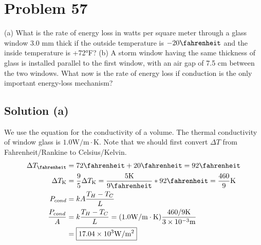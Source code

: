 \documentclass[12pt]{article}
\begin{document}
    \pagebreak
    \section{Problem 57}
        (a) What is the rate of energy loss in watts per square meter through a glass window 3.0 mm thick if the outside temperature is $-20\unit{\fahrenheit}$ and the inside temperature is +72°F? 
        (b) A storm window having the same thickness of glass is installed parallel to the first window, with an air gap of 7.5 cm between the two windows. 
        What now is the rate of energy loss if conduction is the only important energy-loss mechanism?

        \subsection{Solution (a)}
            We use the equation for the conductivity of a volume.
            The thermal conductivity of window glass is $1.0 \unit{\watt/\meter\cdot\kelvin}$. 
            Note that we should first convert $\Delta T$ from Fahrenheit/Rankine to Celsius/Kelvin.
            \begin{align}
                \Delta T_{\unit{\fahrenheit}}   &=  72 \unit{\fahrenheit} + 20 \unit{\fahrenheit}
                    =   92 \unit{\fahrenheit}\\
                \Delta T_{\unit{\kelvin}}  &=  \frac{9}{5} \Delta T_{\unit{\kelvin}}
                    =   \frac{5 \unit{\kelvin}}{9 \unit{\fahrenheit}} * 92 \unit{\fahrenheit}
                    =   \frac{460}{9} \unit{\kelvin}\\
                P_{cond}    &=  kA\frac{T_H - T_C}{L}\\
                \frac{P_{cond}}{A}  &=  k\frac{T_H - T_C}{L}
                    =   (1.0 \unit{\watt/\meter\cdot\kelvin}) \frac{460/9 \unit{\kelvin}}{3 \times 10^{-3} \unit{\meter}}\\
                    &=  \boxed{17.04 \times 10^3 \unit{\watt/\meter^2}}
            \end{align}
\end{document}
